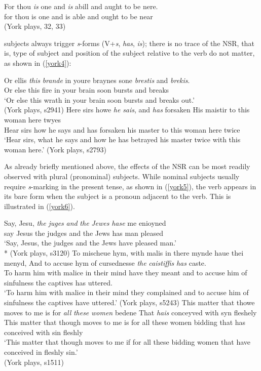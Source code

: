 \documentclass[output=paper]{langsci/langscibook}
\begin{document}
\ea
\gll For thou \textit{is} one and \textit{is} abill and aught to be nere.\\
for thou is one and is able and ought to be near\\
\glt (York plays, 32, 33)
\z

\Tsg{} subjects always trigger \emph{s}-forms (V+\emph{s}, \emph{has},
\emph{is}); there is no trace of the \gls{NSR}, that
is, type of subject and position of the subject relative to the verb do not
matter, as shown in (\ref{york4}):

\ea
\label{york4}
\ea \gll Or ellis \textit{this} \textit{brande} in youre braynes sone \textit{brestis} and \textit{brekis}.\\
Or else this fire in your brain soon bursts and breaks\\
\glt `Or else this wrath in your brain soon bursts and breaks out.'\\
(York plays, s2941)
\ex \gll Here sirs howe \textit{he} \textit{sais}, and \textit{has} forsaken His maistir to this woman here twyes \\
Hear sirs how he says and has forsaken his master to this woman here twice\\
\glt `Hear sirs, what he says and how he has betrayed his master twice with this woman here.' (York plays, s2793)
\z
\z

As already briefly mentioned above, the effects of the \gls{NSR} can be most readily observed with plural (pronominal) subjects. While nominal \Tpl{} subjects usually require \emph{s}-marking in the present tense, as shown in (\ref{york5}), the verb appears in its bare form when the subject is a pronoun adjacent to the verb. This is illustrated in (\ref{york6}).

\ea
\label{york5}
\ea
\gll Say, Jesu, \textit{the} \textit{juges} \textit{and} \textit{the} \textit{Jewes} \textit{hase} me enioyned\\
say Jesus the judges and the Jews has man pleased\\
\glt `Say, Jesus, the judges and the Jews have pleased man.'\\*
(York plays, s3120)
\ex
\gll To mischeue hym, with malis in there mynde haue thei menyd,
And to accuse hym of cursednesse \textit{the} \textit{caistiffis} \textit{has} caste. \\
To harm him with malice in their mind have they meant and to accuse him of sinfulness the captives has uttered.\\
\glt `To harm him with malice in their mind they  complained and to accuse him of sinfulness the captives have uttered.' (York plays, s5243)
\ex
\gll This matter that thowe moves to me is for \textit{all} \textit{these} \textit{women} bedene That \textit{hais} conceyved with syn fleshely \\
    This matter that though moves to me is for all these women bidding that has conceived with sin fleshly\\
\glt `This matter that though moves to me if for all these bidding women that have conceived in fleshly sin.'\\
(York plays, s1511)
\z
\z
\end{document}
